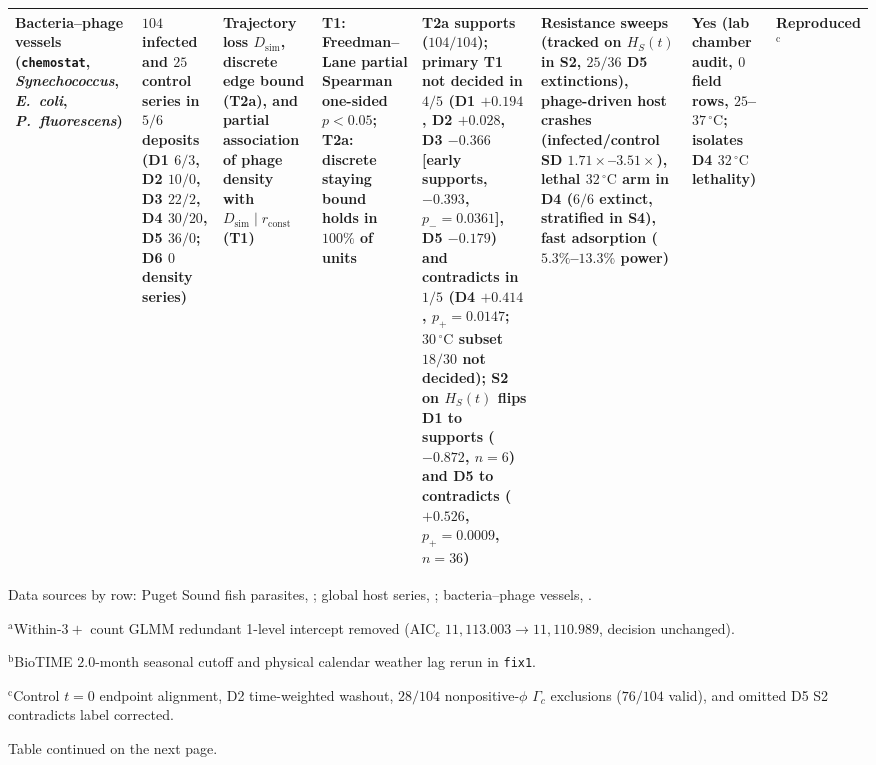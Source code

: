 \begin{table}[p]
{\begin{tabular}{@{}p{}p{}p{}p{}p{}p{}p{}p{}@{}}
Bacteria--phage vessels (\texttt{chemostat}, \textit{Synechococcus}, \textit{E.~coli}, \textit{P.~fluorescens}) & $104$ infected and $25$ control series in $5/6$ deposits (D1 $6/3$, D2 $10/0$, D3 $22/2$, D4 $30/20$, D5 $36/0$; D6 $0$ density series) & Trajectory loss $D_{\mathrm{sim}}$, discrete edge bound (T2a), and partial association of phage density with $D_{\mathrm{sim}} \mid r_{\mathrm{const}}$ (T1) & T1: Freedman--Lane partial Spearman one-sided $p < 0.05$; T2a: discrete staying bound holds in $100\%$ of units & T2a supports ($104/104$); primary T1 not decided in $4/5$ (D1 $+0.194$, D2 $+0.028$, D3 $-0.366$ [early supports, $-0.393$, $p_- = 0.0361$], D5 $-0.179$) and contradicts in $1/5$ (D4 $+0.414$, $p_+ = 0.0147$; $30\,^{\circ}\mathrm{C}$ subset $18/30$ not decided); S2 on $H_S(t)$ flips D1 to supports ($-0.872$, $n = 6$) and D5 to contradicts ($+0.526$, $p_+ = 0.0009$, $n = 36$) & Resistance sweeps (tracked on $H_S(t)$ in S2, $25/36$ D5 extinctions), phage-driven host crashes (infected/control SD $1.71\times$--$3.51\times$), lethal $32\,^{\circ}\mathrm{C}$ arm in D4 ($6/6$ extinct, stratified in S4), fast adsorption ($5.3\%$--$13.3\%$ power) & Yes (lab chamber audit, $0$ field rows, $25$--$37\,^{\circ}\mathrm{C}$; isolates D4 $32\,^{\circ}\mathrm{C}$ lethality) & Reproduced$^{\mathrm{c}}$ \\
\bottomrule
\end{tabular}
\par\vspace{2pt}
\raggedright Data sources by row: Puget Sound fish parasites, \citealp{wood2023,wood2022}; global host series, \citealp{biotime2018,dornelas2018,biotime2025,dornelas2025,prendergast2010,rund2023,neon2023mosquito}; bacteria--phage vessels, \citealp{larsen2019,reuter2026,chaudhry2018,duncan2017,zhao2017}.\par
$^{\mathrm{a}}$Within-$3+$ count GLMM redundant 1-level intercept removed ($\mathrm{AIC}_c$ $11{,}113.003 \to 11{,}110.989$, decision unchanged).\par
$^{\mathrm{b}}$BioTIME $2.0$-month seasonal cutoff and physical calendar weather lag rerun in \texttt{fix1}.\par
$^{\mathrm{c}}$Control $t = 0$ endpoint alignment, D2 time-weighted washout, $28/104$ nonpositive-$\phi$ $\Gamma_c$ exclusions ($76/104$ valid), and omitted D5 S2 contradicts label corrected.\par
Table continued on the next page.}
\end{table}

